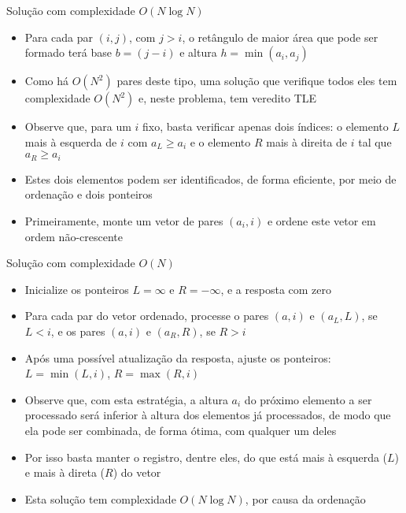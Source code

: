 \begin{frame}[fragile]{Solução com complexidade $O(N\log N)$}

    \begin{itemize}
        \item Para cada par $(i, j)$, com $j > i$, o retângulo de maior área que pode ser
            formado terá base $b = (j - i)$ e altura $h = \min(a_i, a_j)$

        \item Como há $O(N^2)$ pares deste tipo, uma solução que verifique todos eles tem
            complexidade $O(N^2)$ e, neste problema, tem veredito TLE

        \item Observe que, para um $i$ fixo, basta verificar apenas dois índices: o elemento $L$
            mais à esquerda de $i$ com $a_L \geq a_i$ e o elemento $R$ mais à direita de $i$ tal
            que $a_R\geq a_i$

        \item Estes dois elementos podem ser identificados, de forma eficiente, por meio de
            ordenação e dois ponteiros

        \item Primeiramente, monte um vetor de pares $(a_i, i)$ e ordene este vetor em ordem
            não-crescente
   \end{itemize}

\end{frame}

\begin{frame}[fragile]{Solução com complexidade $O(N)$}

    \begin{itemize}
        \item Inicialize os ponteiros $L = \infty$ e $R = -\infty$, e a resposta com zero

        \item Para cada par do vetor ordenado, processe o pares $(a, i)$ e $(a_L, L)$, se $L < i$, e os pares
            $(a, i)$ e $(a_R, R)$, se $R > i$

        \item Após uma possível atualização da resposta, ajuste os ponteiros: $L = \min(L, i)$,
            $R = \max(R, i)$

        \item Observe que, com esta estratégia, a altura $a_i$ do próximo elemento a ser processado
            será inferior à altura dos elementos já processados, de modo que ela pode ser 
            combinada, de forma ótima, com qualquer um deles
        
        \item Por isso basta manter o registro, dentre eles, do que está mais à esquerda ($L$)
            e mais à direta ($R$) do vetor

        \item Esta solução tem complexidade $O(N\log N)$, por causa da ordenação
    \end{itemize}

\end{frame}

